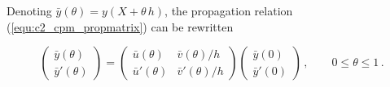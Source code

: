Denoting $\bar{y}(\theta) = y(X+\theta\,h)$, the propagation relation (\ref{equ:c2_cpm_propmatrix}) can be rewritten

\begin{equation}
    \begin{pmatrix}\bar{y}(\theta)\\ \bar{y}'(\theta)\end{pmatrix}
    = \begin{pmatrix} \bar{u}(\theta) & \bar{v}(\theta)/h \\ \bar{u}'(\theta) & \bar{v}'(\theta)/h \end{pmatrix} \begin{pmatrix} \bar{y}(0) \\ \bar{y}'(0) \end{pmatrix} \,, \qquad %
    0 \leq \theta \leq 1 \,. \label{equ:c2_cpm_propmatrix2}
\end{equation}

